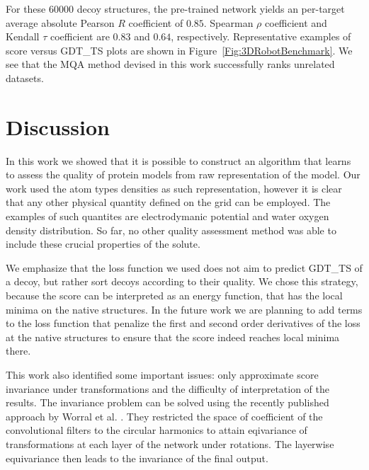 \documentclass{bioinfo}
\begin{document}
%
%
For these 60000 decoy structures, the pre-trained network yields an
per-target average absolute Pearson $R$ coefficient of $0.85$.
Spearman $\rho$ coefficient and Kendall $\tau$ coefficient are $0.83$
and $0.64$, respectively.
%
Representative examples of score versus GDT\_TS plots are shown in
Figure~\ref{Fig:3DRobotBenchmark}. We see that the MQA method devised
in this work successfully ranks unrelated datasets.
%
%
\section{Discussion}
%
%
In this work we showed that it is possible to construct an algorithm that learns to assess the quality of protein models from 
raw representation of the model. Our work used the atom types densities as such representation, however it is clear that 
any other physical quantity defined on the grid can be employed. The examples of such quantites are electrodymanic potential and 
water oxygen density distribution. So far, no other quality assessment method was able to include these 
crucial properties of the solute.

We emphasize that the loss function we used does not aim to predict GDT\_TS of a decoy, but rather sort decoys according 
to their quality. We chose this strategy, because the score can be interpreted as an energy function, that has the local minima 
on the native structures. In the future work we are planning to add terms to the loss function that penalize the first and second order 
derivatives of the loss at the native structures to ensure that the score indeed reaches local minima there.

This work also identified some important issues: only approximate score invariance under transformations and the difficulty of 
interpretation of the results. The invariance problem can be solved using the recently published approach by Worral et al. \citep{worrall2016harmonic}.
They restricted the space of coefficient of the convolutional filters to the circular harmonics to attain eqivariance of transformations at each layer 
of the network under rotations. The layerwise equivariance then leads to the invariance of the final output.
\end{document}
